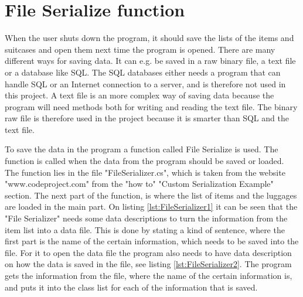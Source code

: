\section{File Serialize function}
When the user shuts down the program, it should save the lists of the items and suitcases and open them next time the program is opened. There are many different ways for saving data. It can e.g. be saved in a raw binary file, a text file or a database like SQL.
The SQL databases either needs a program that can handle SQL or an Internet connection to a server, and is therefore not used in this project. A text file is an more complex way of saving data because the program will need methods both for writing and reading the text file. The binary raw file is therefore used in the project because it is smarter than SQL and the text file.

To save the data in the program a function called File Serialize is used. The function is called when the data from the program should be saved or loaded. The function lies in the file "FileSerializer.cs", which is taken from the website "www.codeproject.com" from the "how to" "Custom Serialization Example" section. The next part of the function, is where the list of items and the luggages are loaded in the main part.
On listing \ref{lst:FileSerializer1} it can be seen that the "File Serializer" needs some data descriptions to turn the information from the item list into a data file. This is done by stating a kind of sentence, where the first part is the name of the certain information, which needs to be saved into the file. 
For it to open the data file the program also needs to have data description on how the data is saved in the file, see listing \ref{lst:FileSerializer2}. The program gets the information from the file, where the name of the certain information is, and puts it into the class list for each of the information that is saved.